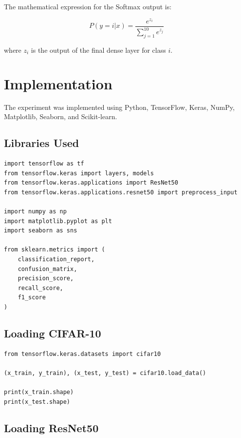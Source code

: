 \documentclass[12pt,a4paper]{article}
\begin{document}
The mathematical expression for the Softmax output is:

\begin{equation}
P(y=i|x)=
\frac{e^{z_i}}
{\sum_{j=1}^{10}e^{z_j}}
\end{equation}

where $z_i$ is the output of the final dense layer for class $i$.


\section{Implementation}

The experiment was implemented using Python, TensorFlow, Keras, NumPy, Matplotlib, Seaborn, and Scikit-learn.

\subsection{Libraries Used}

\begin{lstlisting}
import tensorflow as tf
from tensorflow.keras import layers, models
from tensorflow.keras.applications import ResNet50
from tensorflow.keras.applications.resnet50 import preprocess_input

import numpy as np
import matplotlib.pyplot as plt
import seaborn as sns

from sklearn.metrics import (
    classification_report,
    confusion_matrix,
    precision_score,
    recall_score,
    f1_score
)
\end{lstlisting}

\subsection{Loading CIFAR-10}

\begin{lstlisting}
from tensorflow.keras.datasets import cifar10

(x_train, y_train), (x_test, y_test) = cifar10.load_data()

print(x_train.shape)
print(x_test.shape)
\end{lstlisting}

\subsection{Loading ResNet50}
\end{document}
